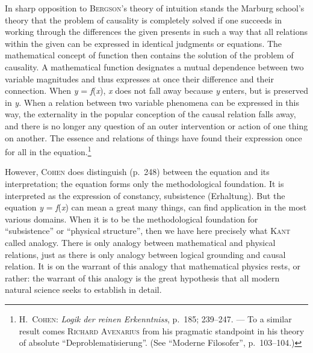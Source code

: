 \documentclass[12pt]{book}
\newcommand{\opage}[1]{\marginnote{\footnotesize\textit{[#1]}}}
\begin{document}
In sharp opposition to \textsc{Bergson}'s theory of intuition stands the Marburg
school's theory that the problem of causality is completely solved if one succeeds
in working through the differences the given presents in such a way that all
relations within the given can be expressed in identical judgments or equations.
The mathematical concept of function then contains the solution of the problem of
causality. A mathematical function designates a mutual dependence between two
variable magnitudes and thus expresses at once their difference and their
connection. When \textit{y} = \textit{f}(\textit{x}), \textit{x} does not fall away
because \textit{y} enters, but is preserved in \textit{y}. When a relation between
two variable phenomena can be expressed in this way, the externality in the popular
conception of the causal relation falls away, and there is no longer \opage{47}any question
of an outer intervention or action of one thing on another. The essence and
relations of things have found their expression once for all in the
equation.\footnote{\textsc{H.\ Cohen}: \textit{Logik der reinen Erkenntniss},
p.\ 185; 239--247. --- To a similar result comes \textsc{Richard Avenarius} from
his pragmatic standpoint in his theory of absolute ``Deproblematisierung''. (See
``Moderne Filosofer'', p.\ 103--104.)}

However, \textsc{Cohen} does dis\-tin\-guish (p.\ 248) between the equation and its
in\-ter\-pre\-ta\-tion; the equation forms only the methodological foundation. It is
interpreted as the expression of constancy, subsistence (Erhaltung). But the
equation \textit{y} = \textit{f}(\textit{x}) can mean a great many things, can find
application in the most various domains. When it is to be the methodological
foundation for ``subsistence'' or ``physical structure'', then we have here
precisely what \textsc{Kant} called analogy. There is only analogy between
mathematical and physical relations, just as there is only analogy between logical
grounding and causal relation. It is on the warrant of this analogy that
mathematical physics rests, or rather: the warrant of this analogy is the great
hypothesis that all modern natural science seeks to establish in detail.
\end{document}
